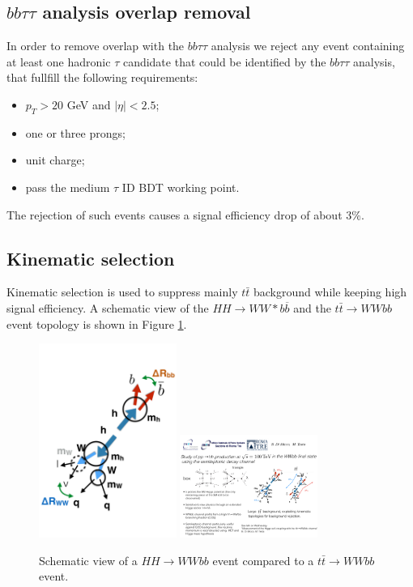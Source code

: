 \subsection{$bb\tau\tau$ analysis overlap removal}
In order to remove overlap with the $bb\tau \tau$ analysis we reject
any event containing at least one hadronic $\tau$ candidate that could be
identified by the $bb\tau\tau$ analysis, that fullfill the following
requirements:
\begin{itemize}
\item $p_T > 20$ GeV and $|\eta| < 2.5$;
\item one or three prongs;
\item unit charge;
\item pass the medium $\tau$ ID BDT working point.
\end{itemize}

The rejection of such events causes a signal efficiency drop of about 3\%.

\subsection{Kinematic selection}
\label{subsec:kincuts}


Kinematic selection is used to suppress mainly $t\bar{t}$ background while keeping
high signal efficiency.  A schematic view of the $HH \to WW{*}b\overline{b}$ and the
$t \bar{t} \to WWbb$ event topology is shown in Figure \ref{fig:cartoon}.
\begin{figure}
\includegraphics[width=0.4\textwidth]{figures/cartoon_hh.pdf}
\includegraphics[width=0.4\textwidth]{figures/cartoon_tt.pdf}
\caption{Schematic view of a $HH \to WWbb$ event compared to a $t\bar{t} \to WWbb$ event.} 
\label{fig:cartoon}
\end{figure}

